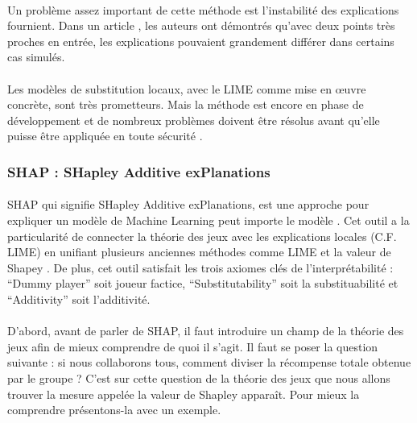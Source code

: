 \documentclass[10pt, french, a4paper]{report}
\begin{document}
\paragraph{}
Un problème assez important de cette méthode est l'instabilité des explications fournient. Dans un article \citep{alvarez_on_the_2018}, les auteurs ont démontrés qu'avec deux points très proches en entrée, les explications pouvaient grandement différer dans certains cas simulés. 

\paragraph{}
Les modèles de substitution locaux, avec le LIME comme mise en œuvre concrète, sont très prometteurs. Mais la méthode est encore en phase de développement et de nombreux problèmes doivent être résolus avant qu'elle puisse être appliquée en toute sécurité \citep{molnar2019}.

\subsubsection{SHAP : SHapley Additive exPlanations}

\paragraph{}
SHAP qui signifie SHapley Additive exPlanations, est une approche pour expliquer un modèle de Machine Learning peut importe le modèle \citep{NIPS2017_7062}. Cet outil a la particularité de connecter la théorie des jeux avec les explications locales (C.F. LIME) en unifiant plusieurs anciennes méthodes comme LIME et la valeur de Shapey \citep{shapley_17._1953}. De plus, cet outil satisfait les trois axiomes clés de l’interprétabilité : ``Dummy player'' soit joueur factice, ``Substitutability'' soit la substituabilité et ``Additivity'' soit l’additivité.

\paragraph{}
D’abord, avant de parler de SHAP, il faut introduire un champ de la théorie des jeux afin de mieux comprendre de quoi il s’agit. Il faut se poser la question suivante : si nous collaborons tous, comment diviser la récompense totale obtenue par le groupe ? C’est sur cette question de la théorie des jeux que nous allons trouver la mesure appelée la valeur de Shapley apparaît. Pour mieux la comprendre présentons-la avec un exemple.
\end{document}
